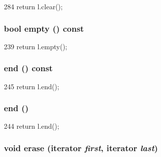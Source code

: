\begin{DoxyCode}
284 { return l.clear(); }
\end{DoxyCode}
\hypertarget{classVarArgs_1_1List_ac6e61de369e994009e36f344f99c15ad}{
\subsubsection[{empty}]{\setlength{\rightskip}{0pt plus 5cm}bool empty () const}}
\label{classVarArgs_1_1List_ac6e61de369e994009e36f344f99c15ad}



\begin{DoxyCode}
239 { return l.empty(); }
\end{DoxyCode}
\hypertarget{classVarArgs_1_1List_a350132543d80a1c1e5be844e6d2878ea}{
\subsubsection[{end}]{ end () const}}
\label{classVarArgs_1_1List_a350132543d80a1c1e5be844e6d2878ea}



\begin{DoxyCode}
245 { return l.end(); }
\end{DoxyCode}
\hypertarget{classVarArgs_1_1List_acad38d52497a975bfb6f2f6acd76631f}{
\subsubsection[{end}]{ end ()}}
\label{classVarArgs_1_1List_acad38d52497a975bfb6f2f6acd76631f}



\begin{DoxyCode}
244 { return l.end(); }
\end{DoxyCode}
\hypertarget{classVarArgs_1_1List_a44333fb0e829973f9df46bc7230996ff}{
\subsubsection[{erase}]{\setlength{\rightskip}{0pt plus 5cm}void erase ({\bf iterator} {\em first}, \/  {\bf iterator} {\em last})}}
\label{classVarArgs_1_1List_a44333fb0e829973f9df46bc7230996ff}



